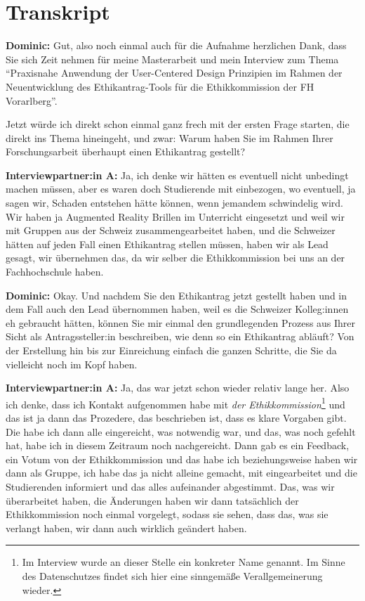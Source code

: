 \documentclass[a4paper,12pt,twoside]{scrreprt}
\begin{document}
\section{Transkript}
\label{appendix:interview-1-transkript}

\textbf{Dominic:} Gut, also noch einmal auch für die Aufnahme herzlichen Dank, dass Sie sich Zeit nehmen für meine Masterarbeit und mein Interview zum Thema \enquote{Praxisnahe Anwendung der User-Centered Design Prinzipien im Rahmen der Neuentwicklung des Ethikantrag-Tools für die Ethikkommission der FH Vorarlberg}.

Jetzt würde ich direkt schon einmal ganz frech mit der ersten Frage starten, die direkt ins Thema hineingeht, und zwar: Warum haben Sie im Rahmen Ihrer Forschungsarbeit überhaupt einen Ethikantrag gestellt?

\textbf{Interviewpartner:in A:} Ja, ich denke wir hätten es eventuell nicht unbedingt machen müssen, aber es waren doch Studierende mit einbezogen, wo eventuell, ja sagen wir, Schaden entstehen hätte können, wenn jemandem schwindelig wird. Wir haben ja Augmented Reality Brillen im Unterricht eingesetzt und weil wir mit Gruppen aus der Schweiz zusammengearbeitet haben, und die Schweizer hätten auf jeden Fall einen Ethikantrag stellen müssen, haben wir als Lead gesagt, wir übernehmen das, da wir selber die Ethikkommission bei uns an der Fachhochschule haben.

\textbf{Dominic:} Okay. Und nachdem Sie den Ethikantrag jetzt gestellt haben und in dem Fall auch den Lead übernommen haben, weil es die Schweizer Kolleg:innen eh gebraucht hätten, können Sie mir einmal den grundlegenden Prozess aus Ihrer Sicht als Antragssteller:in beschreiben, wie denn so ein Ethikantrag abläuft? Von der Erstellung hin bis zur Einreichung einfach die ganzen Schritte, die Sie da vielleicht noch im Kopf haben.

\textbf{Interviewpartner:in A:} Ja, das war jetzt schon wieder relativ lange her. Also ich denke, dass ich Kontakt aufgenommen habe mit \textit{der Ethikkommission}\footnote{Im Interview wurde an dieser Stelle ein konkreter Name genannt. Im Sinne des Datenschutzes findet sich hier eine sinngemäße Verallgemeinerung wieder.} und das ist ja dann das Prozedere, das beschrieben ist, dass es klare Vorgaben gibt. Die habe ich dann alle eingereicht, was notwendig war, und das, was noch gefehlt hat, habe ich in diesem Zeitraum noch nachgereicht. Dann gab es ein Feedback, ein Votum von der Ethikkommission und das habe ich beziehungsweise haben wir dann als Gruppe, ich habe das ja nicht alleine gemacht, mit eingearbeitet und die Studierenden informiert und das alles aufeinander abgestimmt. Das, was wir überarbeitet haben, die Änderungen haben wir dann tatsächlich der Ethikkommission noch einmal vorgelegt, sodass sie sehen, dass das, was sie verlangt haben, wir dann auch wirklich geändert haben.
\end{document}
